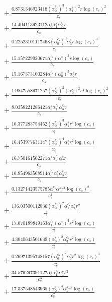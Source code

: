 \documentclass[10pt]{article}
\begin{document}
\begin{align*}
&{}  + \frac{6.8731346923418 \left(\alpha_{0}^{c_s}\right)^{3} \left(\alpha_{1}^s\right)^{2} r \log{\left(c_{s} \right)}^{2}}{c_{s}} \\
&{}  + \frac{14.404113923112 \alpha_{0}^s \alpha_{1}^s \alpha_{3}^{c_s} r}{c_{s}} \\
&{}  + \frac{0.22523101117468 \left(\alpha_{0}^{c_s}\right)^{3} \alpha_{3}^s r \log{\left(c_{s} \right)}^{3}}{c_{s}} \\
&{}  + \frac{15.157229920671 \alpha_{0}^{c_s} \left(\alpha_{1}^s\right)^{3} r \log{\left(c_{s} \right)}}{c_{s}} \\
&{}  + \frac{15.167373100284 \alpha_{0}^{c_s} \left(\alpha_{0}^s\right)^{3} \alpha_{2}^s r}{c_{s}} \\
&{}  + \frac{1.9847558971257 \left(\alpha_{0}^{c_s}\right)^{2} \left(\alpha_{0}^s\right)^{2} r^{4} \log{\left(c_{s} \right)}^{2}}{c_{s}^{4}} \\
&{}  + \frac{8.0358221286421 \alpha_{0}^s \alpha_{1}^{c_s} \alpha_{3}^{c_s} r}{c_{s}} \\
&{}  + \frac{16.377283754452 \left(\alpha_{0}^{c_s}\right)^{3} \alpha_{1}^s r^{3} \log{\left(c_{s} \right)}}{c_{s}^{3}} \\
&{}  + \frac{16.453977631147 \left(\alpha_{0}^{c_s}\right)^{4} \alpha_{1}^s r^{2} \log{\left(c_{s} \right)}}{c_{s}^{2}} \\
&{}  + \frac{16.750161562271 \alpha_{0}^s \alpha_{2}^{c_s} \alpha_{2}^s r}{c_{s}} \\
&{}  + \frac{16.854963568914 \alpha_{0}^{c_s} \alpha_{1}^s \alpha_{3}^{c_s} r}{c_{s}} \\
&{}  + \frac{0.13271423575785 \alpha_{1}^{c_s} \alpha_{1}^s r^{4} \log{\left(c_{s} \right)}^{2}}{c_{s}^{4}} \\
&{}  + \frac{136.03500112836 \left(\alpha_{0}^{c_s}\right)^{2} \alpha_{1}^{c_s} \alpha_{1}^s r^{2}}{c_{s}^{2}} \\
&{}  + \frac{17.070189849163 \alpha_{1}^{c_s} \left(\alpha_{1}^s\right)^{2} r^{2} \log{\left(c_{s} \right)}}{c_{s}^{2}} \\
&{}  + \frac{4.3040643501639 \left(\alpha_{0}^s\right)^{2} \alpha_{3}^{c_s} r^{2} \log{\left(c_{s} \right)}}{c_{s}^{2}} \\
&{}  + \frac{0.26971395748157 \left(\alpha_{0}^{c_s}\right)^{2} \alpha_{3}^s r^{2} \log{\left(c_{s} \right)}^{3}}{c_{s}^{2}} \\
&{}  + \frac{34.579297391127 \alpha_{0}^s \alpha_{1}^{c_s} \alpha_{1}^s r^{3}}{c_{s}^{3}} \\
&{}  + \frac{17.337548543965 \left(\alpha_{0}^s\right)^{4} \alpha_{1}^s r^{2} \log{\left(c_{s} \right)}}{c_{s}^{2}} \\

\end{align*}
\end{document}
